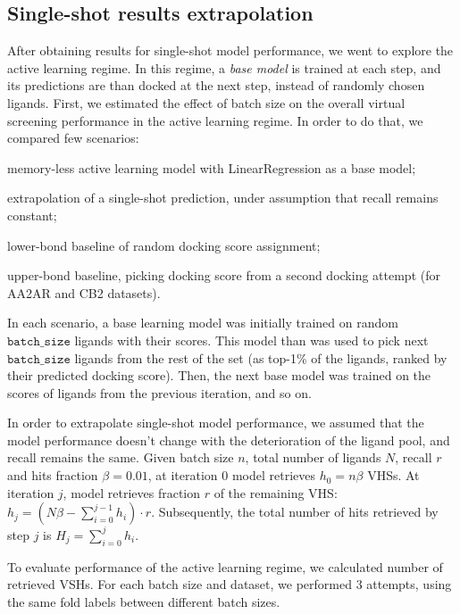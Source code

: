 \subsection{Single-shot results extrapolation}

After obtaining results for single-shot model performance, we went to explore the active learning regime. In this regime, a \textit{base model} is trained at each step, and its predictions are than docked at the next step, instead of randomly chosen ligands. First, we estimated the effect of batch size on the overall virtual screening performance in the active learning regime. In order to do that, we compared few scenarios: 
\begin{enumerate*}[label=(\roman*)]
    \item memory-less active learning model with LinearRegression as a base model;
    \item extrapolation of a single-shot prediction, under assumption that recall remains constant;
    \item lower-bond baseline of random docking score assignment;
    \item upper-bond baseline, picking docking score from a second docking attempt (for AA2AR and CB2 datasets).
\end{enumerate*}

In each scenario, a base learning model was initially trained on random $\texttt{batch\_size}$ ligands with their scores. This model than was used to pick next $\texttt{batch\_size}$ ligands from the rest of the set (as top-1\% of the ligands, ranked by their predicted docking score). Then, the next base model was trained on the scores of ligands from the previous iteration, and so on.

In order to extrapolate single-shot model performance, we assumed that the model performance doesn't change with the deterioration of the ligand pool, and recall remains the same. Given batch size $n$, total number of ligands $N$, recall $r$ and hits fraction $\beta=0.01$, at iteration 0 model retrieves $h_0 = n\beta$ VHSs. At iteration $j$, model retrieves fraction $r$ of the remaining VHS: $h_j = ( N\beta - \sum_{i=0}^{j-1}h_i ) \cdot r$. Subsequently, the total number of hits retrieved by step $j$ is $H_j = \sum_{i=0}^{j} h_i$.

To evaluate performance of the active learning regime, we calculated number of retrieved VSHs. For each batch size and dataset, we performed 3 attempts, using the same fold labels between different batch sizes.

